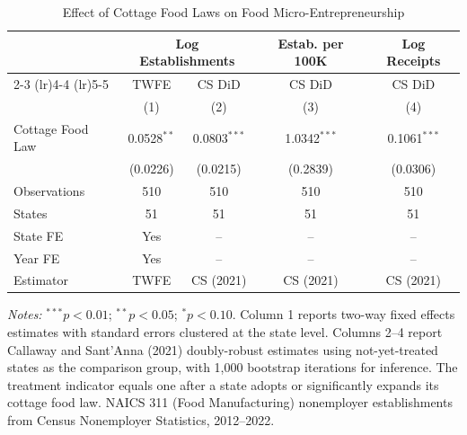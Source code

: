 \begin{table}[htbp]
\centering
\caption{Effect of Cottage Food Laws on Food Micro-Entrepreneurship}
\label{tab:main}
\begin{tabular}{lcccc}
\hline\hline
 & \multicolumn{2}{c}{Log Establishments} & Estab. per 100K & Log Receipts \\
\cmidrule(lr){2-3} \cmidrule(lr){4-4} \cmidrule(lr){5-5}
 & TWFE & CS DiD & CS DiD & CS DiD \\
 & (1) & (2) & (3) & (4) \\
\hline
Cottage Food Law & 0.0528$^{**}$ & 0.0803$^{***}$ & 1.0342$^{***}$ & 0.1061$^{***}$ \\
 & (0.0226) & (0.0215) & (0.2839) & (0.0306) \\
\hline
Observations & 510 & 510 & 510 & 510 \\
States & 51 & 51 & 51 & 51 \\
State FE & Yes & -- & -- & -- \\
Year FE & Yes & -- & -- & -- \\
Estimator & TWFE & CS (2021) & CS (2021) & CS (2021) \\
\hline\hline
\end{tabular}
\begin{tablenotes}[flushleft]\small
\item \textit{Notes:} $^{***}p<0.01$; $^{**}p<0.05$; $^{*}p<0.10$. Column 1 reports two-way fixed effects estimates with standard errors clustered at the state level. Columns 2--4 report Callaway and Sant'Anna (2021) doubly-robust estimates using not-yet-treated states as the comparison group, with 1,000 bootstrap iterations for inference. The treatment indicator equals one after a state adopts or significantly expands its cottage food law. NAICS 311 (Food Manufacturing) nonemployer establishments from Census Nonemployer Statistics, 2012--2022.
\end{tablenotes}
\end{table}
